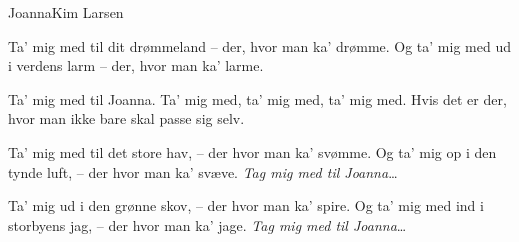 \begin{sang}{Joanna}{Kim Larsen}
\begin{vers}
Ta' mig med til dit drømmeland
-- der, hvor man ka' drømme. 
Og ta' mig med ud i verdens larm
-- der, hvor man ka' larme. 
\end{vers}

\begin{omkvaed}[b]
Ta' mig med til Joanna.
Ta' mig med, ta' mig med, ta' mig med. 
Hvis det er der, hvor man ikke bare
skal passe sig selv. 
\end{omkvaed}

\begin{vers}
Ta' mig med til det store hav,
-- der hvor man ka' svømme.
Og ta' mig op i den tynde luft,
-- der hvor man ka' svæve.
\emph{Tag mig med til Joanna}\ldots
\end{vers}

\begin{vers}
Ta' mig ud i den grønne skov,
-- der hvor man ka' spire.
Og ta' mig med ind i storbyens jag,
-- der hvor man ka' jage.
\emph{Tag mig med til Joanna}\ldots
\end{vers}
\laps
\end{sang}
